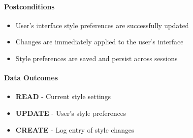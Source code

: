 \paragraph{Postconditions}
\begin{itemize}
    \item User's interface style preferences are successfully updated
    \item Changes are immediately applied to the user's interface
    \item Style preferences are saved and persist across sessions
\end{itemize}

\paragraph{Data Outcomes}
\begin{itemize}
    \item \textbf{READ} - Current style settings
    \item \textbf{UPDATE} - User's style preferences
    \item \textbf{CREATE} - Log entry of style changes
\end{itemize}
